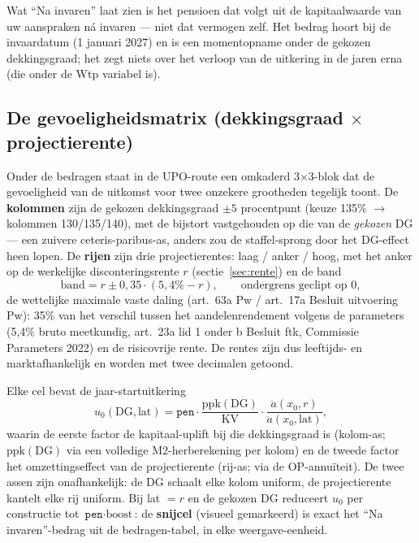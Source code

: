 \documentclass[11pt,a4paper]{article}
\newcommand{\ann}{\ddot{a}}                 %
\newcommand{\dG}{\text{DG}}
\newcommand{\ppk}{\text{ppk}}
\newcommand{\code}[1]{\texttt{#1}}
\begin{document}
Wat ``Na invaren'' laat zien is het pensioen dat volgt uit de kapitaalwaarde van uw aanspraken ná invaren --- niet dat vermogen zelf. Het bedrag hoort bij de invaardatum (1 januari 2027) en is een momentopname onder de gekozen dekkingsgraad; het zegt niets over het verloop van de uitkering in de jaren erna (die onder de Wtp variabel is).

\subsection{De gevoeligheidsmatrix (dekkingsgraad $\times$ projectierente)}
\label{sec:matrix}

Onder de bedragen staat in de UPO-route een omkaderd 3$\times$3-blok dat de gevoeligheid van de uitkomst voor twee onzekere grootheden tegelijk toont. De \textbf{kolommen} zijn de gekozen dekkingsgraad $\pm 5$ procentpunt (keuze 135\% $\to$ kolommen 130/135/140), met de bijstort vastgehouden op die van de \emph{gekozen} DG --- een zuivere ceteris-paribus-as, anders zou de staffel-sprong door het DG-effect heen lopen. De \textbf{rijen} zijn drie projectierentes: laag / anker / hoog, met het anker op de werkelijke disconteringsrente $r$ (sectie~\ref{sec:rente}) en de band
\begin{equation}
\text{band} = r \pm 0{,}35 \cdot (5{,}4\% - r), \qquad \text{ondergrens geclipt op } 0,
\end{equation}
de wettelijke maximale vaste daling (art.\ 63a Pw / art.\ 17a Besluit uitvoering Pw): 35\% van het verschil tussen het aandelenrendement volgens de parameters (5,4\% bruto meetkundig, art.\ 23a lid 1 onder b Besluit ftk, Commissie Parameters 2022) en de risicovrije rente. De rentes zijn dus leeftijds- en marktafhankelijk en worden met twee decimalen getoond.

Elke cel bevat de jaar-startuitkering
\begin{equation}
u_0(\dG, \text{lat}) = \code{pen} \cdot \frac{\ppk(\dG)}{\text{KV}} \cdot \frac{\ann(x_0, r)}{\ann(x_0, \text{lat})},
\end{equation}
waarin de eerste factor de kapitaal-uplift bij die dekkingsgraad is (kolom-as; $\ppk(\dG)$ via een volledige M2-herberekening per kolom) en de tweede factor het omzettingseffect van de projectierente (rij-as; via de OP-annuïteit). De twee assen zijn onafhankelijk: de DG schaalt elke kolom uniform, de projectierente kantelt elke rij uniform. Bij lat $= r$ en de gekozen DG reduceert $u_0$ per constructie tot $\code{pen} \cdot \text{boost}$: de \textbf{snijcel} (visueel gemarkeerd) is exact het ``Na invaren''-bedrag uit de bedragen-tabel, in elke weergave-eenheid.
\end{document}
